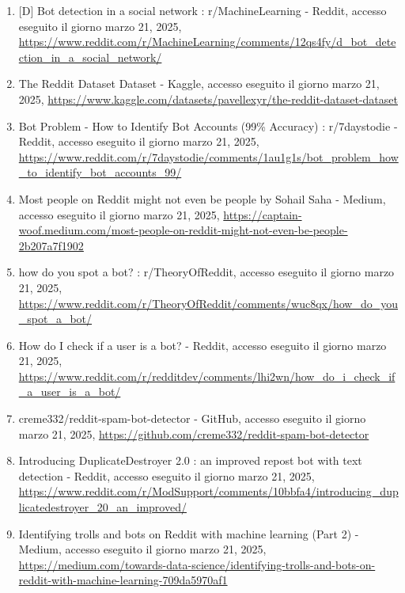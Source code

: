 \documentclass[
  12pt,
  letterpaper,
  DIV=11,
  numbers=noendperiod]{scrartcl}
\begin{document}
\begin{enumerate}
\item
  {[}D{]} Bot detection in a social network : r/MachineLearning -
  Reddit, accesso eseguito il giorno marzo 21, 2025,
  \url{https://www.reddit.com/r/MachineLearning/comments/12qs4fy/d_bot_detection_in_a_social_network/}\\
\item
  The Reddit Dataset Dataset - Kaggle, accesso eseguito il giorno marzo
  21, 2025,
  \url{https://www.kaggle.com/datasets/pavellexyr/the-reddit-dataset-dataset}\\
\item
  Bot Problem - How to Identify Bot Accounts (99\% Accuracy) :
  r/7daystodie - Reddit, accesso eseguito il giorno marzo 21, 2025,
  \url{https://www.reddit.com/r/7daystodie/comments/1au1g1s/bot_problem_how_to_identify_bot_accounts_99/}\\
\item
  Most people on Reddit might not even be people \textbar{} by Sohail
  Saha - Medium, accesso eseguito il giorno marzo 21, 2025,
  \url{https://captain-woof.medium.com/most-people-on-reddit-might-not-even-be-people-2b207a7f1902}\\
\item
  how do you spot a bot? : r/TheoryOfReddit, accesso eseguito il giorno
  marzo 21, 2025,
  \url{https://www.reddit.com/r/TheoryOfReddit/comments/wuc8qx/how_do_you_spot_a_bot/}\\
\item
  How do I check if a user is a bot? - Reddit, accesso eseguito il
  giorno marzo 21, 2025,
  \url{https://www.reddit.com/r/redditdev/comments/lhi2wn/how_do_i_check_if_a_user_is_a_bot/}\\
\item
  creme332/reddit-spam-bot-detector - GitHub, accesso eseguito il giorno
  marzo 21, 2025,
  \url{https://github.com/creme332/reddit-spam-bot-detector}\\
\item
  Introducing DuplicateDestroyer 2.0 : an improved repost bot with text
  detection - Reddit, accesso eseguito il giorno marzo 21, 2025,
  \url{https://www.reddit.com/r/ModSupport/comments/10bbfa4/introducing_duplicatedestroyer_20_an_improved/}\\
\item
  Identifying trolls and bots on Reddit with machine learning (Part 2) -
  Medium, accesso eseguito il giorno marzo 21, 2025,
  \url{https://medium.com/towards-data-science/identifying-trolls-and-bots-on-reddit-with-machine-learning-709da5970af1}\\

\end{enumerate}
\end{document}

